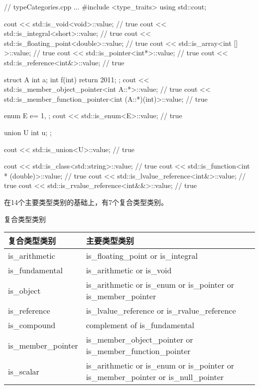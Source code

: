 \begin{cpp}
// typeCategories.cpp
...
#include <type_traits>
using std::cout;

cout << std::is_void<void>::value; // true
cout << std::is_integral<short>::value; // true
cout << std::is_floating_point<double>::value; // true
cout << std::is_array<int [] >::value; // true
cout << std::is_pointer<int*>::value; // true
cout << std::is_reference<int&>::value; // true

struct A{
	int a;
	int f(int){ return 2011; }
};
cout << std::is_member_object_pointer<int A::*>::value; // true
cout << std::is_member_function_pointer<int (A::*)(int)>::value; // true

enum E{
	e= 1,
};
cout << std::is_enum<E>::value; // true

union U{
	int u;
};

cout << std::is_union<U>::value; // true

cout << std::is_class<std::string>::value; // true
cout << std::is_function<int * (double)>::value; // true
cout << std::is_lvalue_reference<int&>::value; // true
cout << std::is_rvalue_reference<int&&>::value; // true
\end{cpp}


在14个主要类型类别的基础上，有7个复合类型类别。

\begin{center}
复合类型类别
\end{center}

\begin{longtable}[c]{|l|l|}
\hline
\textbf{复合类型类别} & \textbf{主要类型类别}                 \\ \hline
\endfirsthead
%
\endhead
%
is\_arithmetic                     & is\_floating\_point or is\_integral            \\ \hline
is\_fundamental                    & is\_arithmetic or is\_void                     \\ \hline
is\_object          & is\_arithmetic or is\_enum or is\_pointer or is\_member\_pointer                      \\ \hline
is\_reference                      & is\_lvalue\_reference or is\_rvalue\_reference \\ \hline
is\_compound                       & complement of is\_fundamental                  \\ \hline
is\_member\_pointer & is\_member\_object\_pointer or is\_member\_function\_pointer                          \\ \hline
is\_scalar          & is\_arithmetic or is\_enum or is\_pointer or is\_member\_pointer or is\_null\_pointer \\ \hline
\end{longtable}

